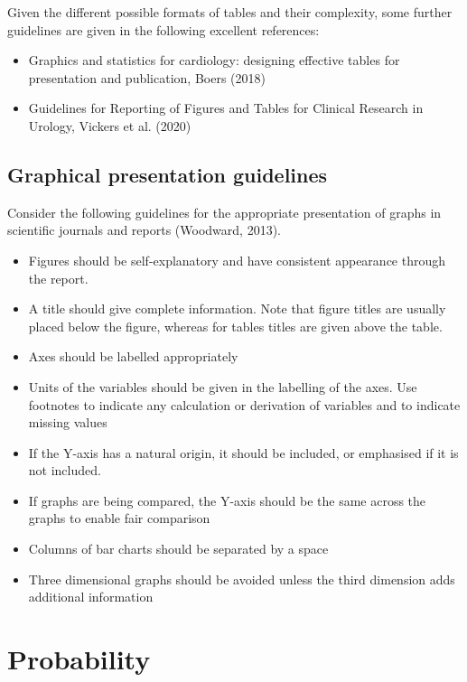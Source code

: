 \documentclass[
  a4paper,
]{memoir}
\providecommand{\tightlist}{%
  \setlength{\itemsep}{0pt}\setlength{\parskip}{0pt}}
\begin{document}
Given the different possible formats of tables and their complexity,
some further guidelines are given in the following excellent references:

\begin{itemize}
\tightlist
\item
  Graphics and statistics for cardiology: designing effective tables for
  presentation and publication, Boers (2018)
\item
  Guidelines for Reporting of Figures and Tables for Clinical Research
  in Urology, Vickers et al. (2020)
\end{itemize}

\subsection{Graphical presentation
guidelines}\label{graphical-presentation-guidelines}

Consider the following guidelines for the appropriate presentation of
graphs in scientific journals and reports (Woodward, 2013).

\begin{itemize}
\tightlist
\item
  Figures should be self-explanatory and have consistent appearance
  through the report.
\item
  A title should give complete information. Note that figure titles are
  usually placed below the figure, whereas for tables titles are given
  above the table.
\item
  Axes should be labelled appropriately
\item
  Units of the variables should be given in the labelling of the axes.
  Use footnotes to indicate any calculation or derivation of variables
  and to indicate missing values
\item
  If the Y-axis has a natural origin, it should be included, or
  emphasised if it is not included.
\item
  If graphs are being compared, the Y-axis should be the same across the
  graphs to enable fair comparison
\item
  Columns of bar charts should be separated by a space
\item
  Three dimensional graphs should be avoided unless the third dimension
  adds additional information
\end{itemize}

\section{Probability}\label{probability}
\end{document}
